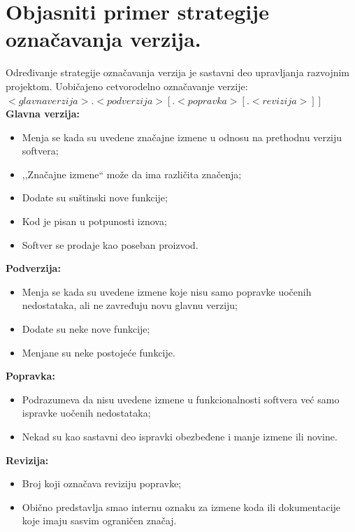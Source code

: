 \documentclass[a4paper]{article}
\begin{document}
\section{Objasniti primer strategije označavanja verzija.}
  Određivanje strategije označavanja verzija je sastavni deo upravljanja razvojnim projektom. 
  Uobičajeno cetvorodelno označavanje verzije:\\
  \indent $<glavna verzija>.<podverzija>[.<popravka>[.<revizija>]]$\\
  \textbf{Glavna verzija:}
  \begin{itemize}
    \item Menja se kada su uvedene značajne izmene u odnosu na prethodnu verziju softvera;
    \item ,,Značajne izmene`` može da ima različita značenja;
    \item Dodate su suštinski nove funkcije;
    \item Kod je pisan u potpunosti iznova;
    \item Softver se prodaje kao poseban proizvod.
  \end{itemize}
  \textbf{Podverzija:}
  \begin{itemize}
    \item Menja se kada su uvedene izmene koje nisu samo popravke uočenih nedostataka, 
          ali ne zavređuju novu glavnu verziju;
    \item Dodate su neke nove funkcije;
    \item Menjane su neke postojeće funkcije.
  \end{itemize}
  \textbf{Popravka:}
  \begin{itemize}
    \item Podrazumeva da nisu uvedene izmene u funkcionalnosti softvera već samo ispravke 
          uočenih nedostataka;
    \item Nekad su kao sastavni deo ispravki obezbeđene i manje izmene ili novine.
  \end{itemize}
  \textbf{Revizija:}
  \begin{itemize}
    \item Broj koji označava reviziju popravke;
    \item Obično predstavlja smao internu oznaku za izmene koda ili dokumentacije koje 
          imaju sasvim ograničen značaj.
  \end{itemize}
  
\end{document}
